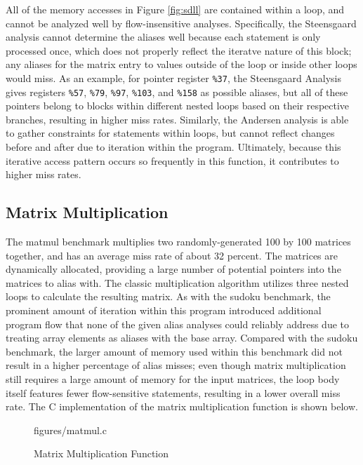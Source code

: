 All of the memory accesses in Figure \ref{fig:sdll} are contained within a loop, and cannot be analyzed well by flow-insensitive analyses. Specifically, the Steensgaard analysis cannot determine the aliases well because each statement is only processed once, which does not properly reflect the iteratve nature of this block; any aliases for the matrix entry to values outside of the loop or inside other loops would miss. As an example, for pointer register \texttt{\%37}, the Steensgaard Analysis gives registers \texttt{\%57}, \texttt{\%79}, \texttt{\%97}, \texttt{\%103}, and \texttt{\%158} as possible aliases, but all of these pointers belong to blocks within different nested loops based on their respective branches, resulting in higher miss rates. Similarly, the Andersen analysis is able to gather constraints for statements within loops, but cannot reflect changes before and after due to iteration within the program. Ultimately, because this iterative access pattern occurs so frequently in this function, it contributes to higher miss rates.

\subsection{Matrix Multiplication}
The matmul benchmark multiplies two randomly-generated 100 by 100 matrices together, and has an average miss rate of about 32 percent. The matrices are dynamically allocated, providing a large number of potential pointers into the matrices to alias with. The classic multiplication algorithm utilizes three nested loops to calculate the resulting matrix. As with the sudoku benchmark, the prominent amount of iteration within this program introduced additional program flow that none of the given alias analyses could reliably address due to treating array elements as aliases with the base array. Compared with the sudoku benchmark, the larger amount of memory used within this benchmark did not result in a higher percentage of alias misses; even though matrix multiplication still requires a large amount of memory for the input matrices, the loop body itself features fewer flow-sensitive statements, resulting in a lower overall miss rate. The C implementation of the matrix multiplication function is shown below.

\begin{figure} [h]
   {figures/matmul.c}
  \caption{Matrix Multiplication Function}
  \label{fig:mmc}
\end{figure}

